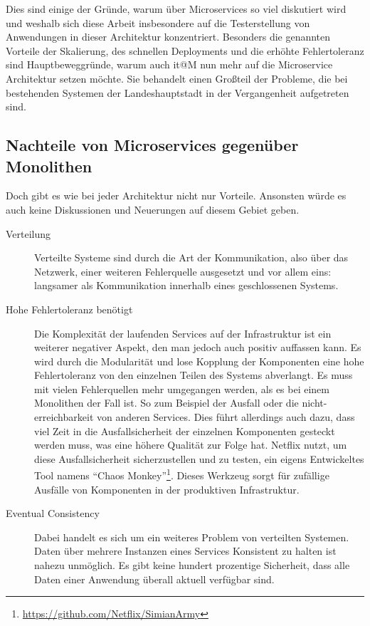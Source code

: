 \documentclass[12pt,a4paper,bibliography=totocnumbered,listof=totocnumbered]{scrartcl}
\begin{document}
Dies sind einige der Gründe, warum über Microservices so viel diskutiert wird und weshalb sich diese Arbeit insbesondere auf die Testerstellung von Anwendungen in dieser Architektur konzentriert. Besonders die genannten Vorteile der Skalierung, des schnellen Deployments und die erhöhte Fehlertoleranz sind Hauptbeweggründe, warum auch it@M nun mehr auf die Microservice Architektur setzen möchte. Sie behandelt einen Großteil der Probleme, die bei bestehenden Systemen der Landeshauptstadt in der Vergangenheit aufgetreten sind.

\subsection{Nachteile von Microservices gegenüber Monolithen}\label{ch:ms-mon-cons}

Doch gibt es wie bei jeder Architektur nicht nur Vorteile. Ansonsten würde es auch keine Diskussionen und Neuerungen auf diesem Gebiet geben.

\begin{description}
	\item[Verteilung] Verteilte Systeme sind durch die Art der Kommunikation, also über das Netzwerk, einer weiteren Fehlerquelle ausgesetzt und vor allem eins: langsamer als Kommunikation innerhalb eines geschlossenen Systems\cite{tradeoffs}. 
	
	\item[Hohe Fehlertoleranz benötigt\label{high-tolerance}] Die Komplexität der laufenden Services auf der Infrastruktur ist ein weiterer negativer Aspekt, den man jedoch auch positiv auffassen kann. Es wird durch die Modularität und lose Kopplung der Komponenten eine hohe Fehlertoleranz von den einzelnen Teilen des Systems abverlangt. Es muss mit vielen Fehlerquellen mehr umgegangen werden, als es bei einem Monolithen der Fall ist. So zum Beispiel der Ausfall oder die nicht-erreichbarkeit von anderen Services. Dies führt allerdings auch dazu, dass viel Zeit in die Ausfallsicherheit der einzelnen Komponenten gesteckt werden muss, was eine höhere Qualität zur Folge hat. Netflix nutzt, um diese Ausfallsicherheit sicherzustellen und zu testen, ein eigens Entwickeltes Tool namens \enquote{Chaos Monkey}\footnote{\url{https://github.com/Netflix/SimianArmy}}. Dieses Werkzeug sorgt für zufällige Ausfälle von Komponenten in der produktiven Infrastruktur.
	
	\item[Eventual Consistency] Dabei handelt es sich um ein weiteres Problem von verteilten Systemen. Daten über mehrere Instanzen eines Services Konsistent zu halten ist nahezu unmöglich. Es gibt keine hundert prozentige Sicherheit, dass alle Daten einer Anwendung überall aktuell verfügbar sind.
\end{description}
\end{document}
